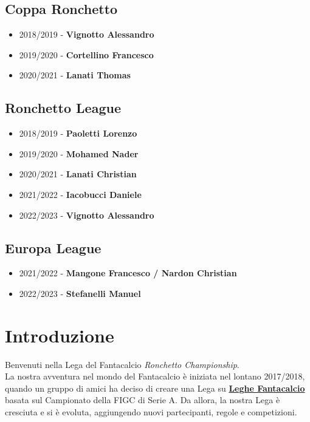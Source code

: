 \documentclass[12pt]{article}
\begin{document}
\subsection*{Coppa Ronchetto}
\begin{itemize}
    \item 2018/2019 - \textbf{Vignotto Alessandro}
    \item 2019/2020 - \textbf{Cortellino Francesco}
    \item 2020/2021 - \textbf{Lanati Thomas}
\end{itemize}

\subsection*{Ronchetto League}
\begin{itemize}
    \item 2018/2019 - \textbf{Paoletti Lorenzo}
    \item 2019/2020 - \textbf{Mohamed Nader}
    \item 2020/2021 - \textbf{Lanati Christian}
    \item 2021/2022 - \textbf{Iacobucci Daniele}
    \item 2022/2023 - \textbf{Vignotto Alessandro}
\end{itemize}

\subsection*{Europa League}
\begin{itemize}
    \item 2021/2022 - \textbf{Mangone Francesco / Nardon Christian}
    \item 2022/2023 - \textbf{Stefanelli Manuel}
\end{itemize}


\newpage
\tableofcontents

\newpage
\section{Introduzione}

Benvenuti nella Lega del Fantacalcio \textit{Ronchetto Championship}. \\ La nostra avventura nel mondo del Fantacalcio è iniziata nel lontano 2017/2018, quando un gruppo di amici ha deciso di creare una Lega su \textbf{\hyperref[leghe-fantacalcio]{Leghe Fantacalcio}} basata sul Campionato della FIGC di Serie A. Da allora, la nostra Lega è cresciuta e si è evoluta, aggiungendo nuovi partecipanti, regole e competizioni.
\end{document}
